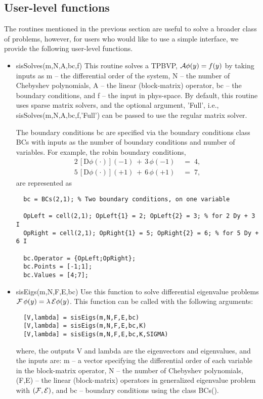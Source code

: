 \documentclass[%
secnumarabic,%
 amssymb, amsmath,%
 aps,prf,superscriptaddress,longbibliography
frontmatterverbose,
]{revtex4-2}
\begin{document}
\subsection*{User-level functions}
The routines mentioned in the previous section are useful to solve a broader class of problems, however, for users who would like to use a simple interface, we provide the following user-level functions.
\begin{itemize}
  \item {\sf sisSolves(m,N,A,bc,f)} This routine solves a TPBVP, $\mathcal{A} \phi (y) = f(y)$ by taking inputs as {\sf m} -- the differential order of the system, {\sf N} -- the number of Chebyshev polynomials, {\sf A} -- the linear (block-matrix) operator, {\sf bc} -- the boundary conditions, and {\sf f} -- the input in phys-space. By default, this routine uses sparse matrix solvers, and the optional argument, {\sf 'Full'}, i.e., {\sf sisSolves(m,N,A,bc,f,'Full')} can be passed to use the regular matrix solver.
  
  The boundary conditions {\sf bc} are specified via the boundary conditions class {\sf BCs} with inputs as the number of boundary conditions and number of variables. For example, the robin boundary conditions,
  \begin{align*}
    2\, [\mathrm D \phi (\cdot)] (-1) \,+\, 3\, \phi (-1) \;&=\; 4,\\
  5\, [\mathrm D \phi (\cdot)](+1) \,+\, 6\, \phi (+1) \;&=\; 7,
  \end{align*}
are represented as 
  \begin{lstlisting}
  bc = BCs(2,1); % Two boundary conditions, on one variable

  OpLeft = cell(2,1); OpLeft{1} = 2; OpLeft{2} = 3; % for 2 Dy + 3 I
  OpRight = cell(2,1); OpRight{1} = 5; OpRight{2} = 6; % for 5 Dy + 6 I

  bc.Operator = {OpLeft;OpRight};
  bc.Points = [-1;1];
  bc.Values = [4;7];
  \end{lstlisting}
  \item {\sf sisEigs(m,N,F,E,bc)} Use this function to solve differential eigenvalue problems $\mathcal{F} \, \phi (y) = \lambda \,\mathcal{E} \phi (y)$. This function can be called with the following arguments:
  \begin{lstlisting}
  [V,lambda] = sisEigs(m,N,F,E,bc)
  [V,lambda] = sisEigs(m,N,F,E,bc,K)
  [V,lambda] = sisEigs(m,N,F,E,bc,K,SIGMA)
  \end{lstlisting}   
  where, the outputs {\sf V} and {\sf lambda} are the eigenvectors and eigenvalues, and the inputs are: {\sf m} -- a vector specifying the differential order of each variable in the
  block-matrix operator, {\sf N} -- the number of Chebyshev polynomials, {\sf (F,E)} -- the linear (block-matrix) operators in generalized eigenvalue problem
  with $(\mathcal{F}, \mathcal{E})$, and {\sf bc} -- boundary conditions using the class BCs(). 
  

\end{itemize}
\end{document}
